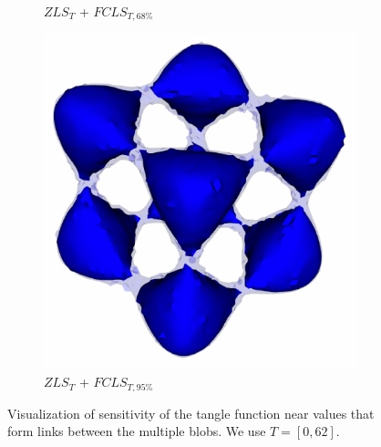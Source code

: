 \begin{figure}[!h]
\begin{subfigure}{0.195\linewidth}
\vspace{-2mm}
\caption{$ZLS_{T}$ + $FCLS_{T,68\%}$}
\label{fig:tangle_fcls_68}
\end{subfigure}
\begin{subfigure}{0.195\linewidth}
\centering
\includegraphics[width=0.8\linewidth]{Images/Tangle/fcls_95.pdf}
\vspace{-2mm}
\caption{$ZLS_{T}$ + $FCLS_{T,95\%}$}
\label{fig:tangle_fcls_95}
\end{subfigure}
\vspace{-2mm}
\caption{Visualization of sensitivity of the tangle function near values that form links between the multiple blobs. We use $T=[0,62]$.}
\vspace{-2mm}
\label{fig:tangle}
\end{figure}
